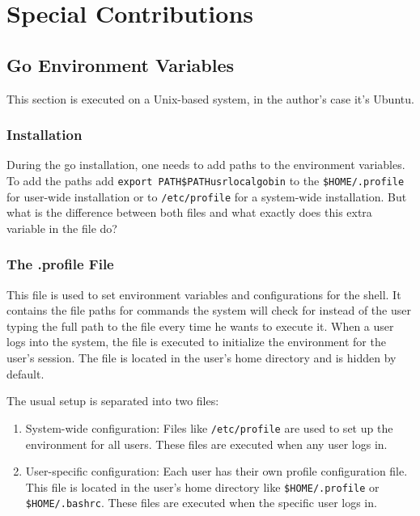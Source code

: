 \chapter{Special Contributions}
\label{ch:special_contributions}

\section{Go Environment Variables}
\label{sec:go_environment_variables}
This section is executed on a Unix-based system, in the author's case it's Ubuntu.

\subsection{Installation}
During the go installation, one needs to add paths to the environment variables.
To add the paths add \texttt{export PATH\=\$PATH\:\/usr\/local\/go\/bin} 
to the \texttt{\$HOME/.profile} for user-wide installation or to \texttt{/etc/profile} for a system-wide installation.
But what is the difference between both files and what exactly does this extra variable in the file do?

\subsection{The .profile File}
This file is used to set environment variables and configurations for the shell.
It contains the file paths for commands the system will check for instead of the user typing the full path to the file every time he wants to execute it.
When a user logs into the system, the file is executed to initialize the environment for the user's session.
The file is located in the user's home directory and is hidden by default.

The usual setup is separated into two files:
\begin{enumerate}
    \item System-wide configuration:
        Files like \texttt{/etc/profile} are used to set up the environment for all users.
        These files are executed when any user logs in.
    \item User-specific configuration:
        Each user has their own profile configuration file.
        This file is located in the user's home directory like \texttt{\$HOME/.profile} or \texttt{\$HOME/.bashrc}.
        These files are executed when the specific user logs in.
\end{enumerate}


